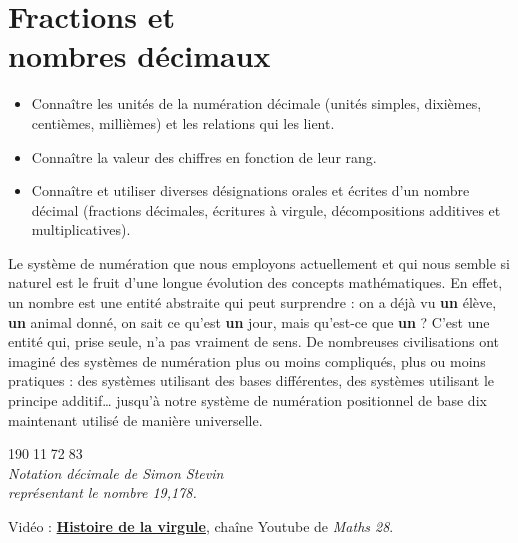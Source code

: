 \themaN
\graphicspath{{../Ch2_Nombres_entiers_et_decimaux/Images/}}

\chapter{Fractions et\\nombres décimaux}
\label{C03}

\begin{prerequis}
   \begin{itemize}
      \item Connaître les unités de la numération décimale (unités simples, dixièmes, centièmes, millièmes) et les relations qui les lient.
      \item Connaître la valeur des chiffres en fonction de leur rang.
      \item Connaître et utiliser diverses désignations orales et écrites d’un nombre décimal (fractions décimales, écritures à virgule, décompositions additives et multiplicatives).
   \end{itemize}
\end{prerequis}

\vfill

\begin{debat}
   Le système de numération que nous employons actuellement et qui nous semble si naturel est le fruit d'une longue évolution des concepts mathématiques. En effet, un nombre est une entité abstraite qui peut surprendre : on a déjà vu {\bf un} élève, {\bf un} animal donné, on sait ce qu'est {\bf un} jour, mais qu'est-ce que {\bf un} ? C'est une entité qui, prise seule, n'a pas vraiment de sens. De nombreuses civilisations ont imaginé des systèmes de numération plus ou moins compliqués, plus ou moins pratiques : des systèmes utilisant des bases différentes, des systèmes utilisant le principe additif\dots{} jusqu'à notre système de numération positionnel de base dix maintenant utilisé de manière universelle. \\
   \begin{center}
      \textcolor{B1}{{\huge 19\textcircled{\Large 0}1\textcircled{\Large 1}7\textcircled{\Large2}8\textcircled{\Large 3}} \\ [3mm]
      \it Notation décimale de Simon Stevin \\
      représentant le nombre 19,178.}
   \end{center}
   \bigskip
   \begin{cadre}[B2][F4]
      \begin{center}
         Vidéo : \href{https://www.youtube.com/watch?v=bkGMa1EJkSA}{\bf Histoire de la virgule}, chaîne Youtube de {\it Maths 28}.
      \end{center}
   \end{cadre}
\end{debat}

